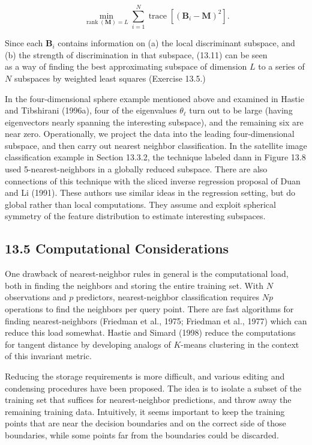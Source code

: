 \documentclass[10pt]{article}
\begin{document}
\begin{equation*}
\min _{\operatorname{rank}(\mathbf{M})=L} \sum_{i=1}^{N} \operatorname{trace}\left[\left(\mathbf{B}_{i}-\mathbf{M}\right)^{2}\right] . \tag{13.11}
\end{equation*}


Since each $\mathbf{B}_{i}$ contains information on (a) the local discriminant subspace, and (b) the strength of discrimination in that subspace, (13.11) can be seen\\
as a way of finding the best approximating subspace of dimension $L$ to a series of $N$ subspaces by weighted least squares (Exercise 13.5.)

In the four-dimensional sphere example mentioned above and examined in Hastie and Tibshirani (1996a), four of the eigenvalues $\theta_{\ell}$ turn out to be large (having eigenvectors nearly spanning the interesting subspace), and the remaining six are near zero. Operationally, we project the data into the leading four-dimensional subspace, and then carry out nearest neighbor classification. In the satellite image classification example in Section 13.3.2, the technique labeled dann in Figure 13.8 used 5-nearest-neighbors in a globally reduced subspace. There are also connections of this technique with the sliced inverse regression proposal of Duan and Li (1991). These authors use similar ideas in the regression setting, but do global rather than local computations. They assume and exploit spherical symmetry of the feature distribution to estimate interesting subspaces.

\subsection*{13.5 Computational Considerations}
One drawback of nearest-neighbor rules in general is the computational load, both in finding the neighbors and storing the entire training set. With $N$ observations and $p$ predictors, nearest-neighbor classification requires $N p$ operations to find the neighbors per query point. There are fast algorithms for finding nearest-neighbors (Friedman et al., 1975; Friedman et al., 1977) which can reduce this load somewhat. Hastie and Simard (1998) reduce the computations for tangent distance by developing analogs of $K$-means clustering in the context of this invariant metric.

Reducing the storage requirements is more difficult, and various editing and condensing procedures have been proposed. The idea is to isolate a subset of the training set that suffices for nearest-neighbor predictions, and throw away the remaining training data. Intuitively, it seems important to keep the training points that are near the decision boundaries and on the correct side of those boundaries, while some points far from the boundaries could be discarded.
\end{document}

